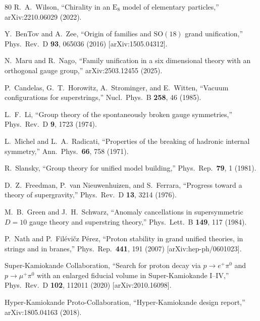 \documentclass[aps,prd,twocolumn,showpacs,preprintnumbers,superscriptaddress,floatfix]{revtex4-2}
\begin{document}
\begin{thebibliography}{80}
R.~A.~Wilson,
``Chirality in an $\mathrm{E}_8$ model of elementary particles,''
arXiv:2210.06029 (2022).

Y.~BenTov and A.~Zee,
``Origin of families and $\mathrm{SO}(18)$ grand unification,''
Phys.\ Rev.\ D \textbf{93}, 065036 (2016)
[arXiv:1505.04312].

N.~Maru and R.~Nago,
``Family unification in a six dimensional theory with an
orthogonal gauge group,''
arXiv:2503.12455 (2025).

P.~Candelas, G.~T.~Horowitz, A.~Strominger, and E.~Witten,
``Vacuum configurations for superstrings,''
Nucl.\ Phys.\ B \textbf{258}, 46 (1985).


L.~F.~Li,
``Group theory of the spontaneously broken gauge symmetries,''
Phys.\ Rev.\ D \textbf{9}, 1723 (1974).

L.~Michel and L.~A.~Radicati,
``Properties of the breaking of hadronic internal symmetry,''
Ann.\ Phys.\ \textbf{66}, 758 (1971).

R.~Slansky,
``Group theory for unified model building,''
Phys.\ Rep.\ \textbf{79}, 1 (1981).


D.~Z.~Freedman, P.~van Nieuwenhuizen, and S.~Ferrara,
``Progress toward a theory of supergravity,''
Phys.\ Rev.\ D \textbf{13}, 3214 (1976).

M.~B.~Green and J.~H.~Schwarz,
``Anomaly cancellations in supersymmetric $D = 10$ gauge theory
and superstring theory,''
Phys.\ Lett.\ B \textbf{149}, 117 (1984).


P.~Nath and P.~Fil\'evi\v{c}z P\'erez,
``Proton stability in grand unified theories, in strings and
in branes,''
Phys.\ Rep.\ \textbf{441}, 191 (2007)
[arXiv:hep-ph/0601023].

Super-Kamiokande Collaboration,
``Search for proton decay via $p \to e^+ \pi^0$ and
$p \to \mu^+ \pi^0$ with an enlarged fiducial volume in
Super-Kamiokande I--IV,''
Phys.\ Rev.\ D \textbf{102}, 112011 (2020)
[arXiv:2010.16098].

Hyper-Kamiokande Proto-Collaboration,
``Hyper-Kamiokande design report,''
arXiv:1805.04163 (2018).


\end{thebibliography}
\end{document}
